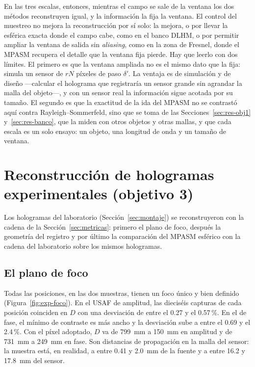 En las tres escalas, entonces, mientras el campo se sale de la ventana los dos
métodos reconstruyen igual, y la información la fija la ventana. El control
del muestreo no mejora la reconstrucción por sí solo: la mejora, o por
llevar la esférica exacta donde el campo cabe, como en el banco DLHM, o por
permitir ampliar la ventana de salida sin \emph{aliasing}, como en la zona de
Fresnel, donde el MPASM recupera el detalle que la ventana fija pierde.
Hay que leerlo con dos límites. El
primero es que la ventana ampliada no es el mismo dato que la fija: simula un
sensor de $rN$ píxeles de paso $\delta'$. La ventaja es de simulación y de
diseño ---calcular el holograma que registraría un sensor grande sin agrandar
la malla del objeto---, y con un sensor real la información sigue acotada por
su tamaño. El segundo es que la exactitud de la ida del MPASM no se contrastó
aquí contra Rayleigh--Sommerfeld, sino que se toma de las
Secciones~\ref{sec:res-obj1} y~\ref{sec:res-banco}, que la miden con otros
objetos y otras mallas, y que cada escala es un solo ensayo: un objeto, una longitud de onda
y un tamaño de ventana.


\section{Reconstrucción de hologramas experimentales (objetivo 3)}
\label{sec:res-obj3}

Los hologramas del laboratorio (Sección~\ref{sec:montaje}) se
reconstruyeron con la cadena de la Sección~\ref{sec:metricas}: primero el
plano de foco, después la geometría del registro y por último la comparación
del MPASM esférico con la cadena del laboratorio sobre los mismos hologramas.

\subsection{El plano de foco}

Todas las posiciones, en las dos muestras, tienen un foco único y bien
definido (Figura~\ref{fig:exp-foco}). En el USAF de amplitud, las dieciséis
capturas de cada posición coinciden en $D$ con una desviación de entre el 0.27
y el 0.57\,\%. En el de fase, el mínimo de contraste es más ancho y la
desviación sube a entre el 0.69 y el 2.4\,\%. Con el píxel adoptado,
$D$ va de \SI{799}{mm} a \SI{150}{mm} en amplitud y de \SI{731}{mm} a
\SI{249}{mm} en fase. Son distancias de propagación en la malla del sensor: la
muestra está, en realidad, a entre 0.41 y \SI{2.0}{mm} de la fuente y a
entre 16.2 y \SI{17.8}{mm} del sensor.

